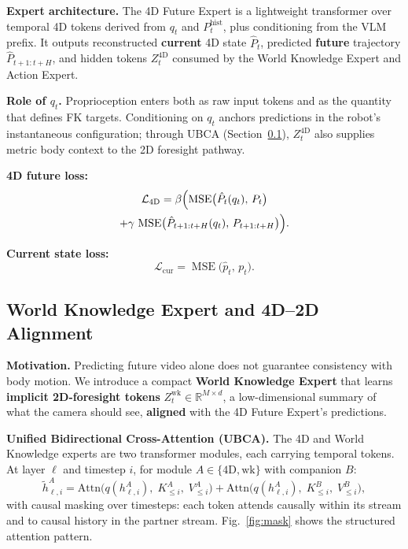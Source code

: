 \documentclass[journal]{IEEEtran}
\begin{document}
\textbf{Expert architecture.} The 4D Future Expert is a lightweight
transformer over temporal 4D tokens derived from $q_t$ and
$P^{\mathrm{hist}}_t$, plus conditioning from the VLM prefix. It outputs
reconstructed \textbf{current} 4D state $\hat{P}_t$, predicted
\textbf{future} trajectory $\hat{P}_{t+1:t+H}$, and hidden tokens
$Z^{\mathrm{4D}}_t$ consumed by the World Knowledge Expert and Action
Expert.

\textbf{Role of $q_t$.} Proprioception enters both as raw input tokens
and as the quantity that defines FK targets. Conditioning on $q_t$
anchors predictions in the robot's instantaneous configuration; through
UBCA (Section~\ref{sec:wk}), $Z^{\mathrm{4D}}_t$ also supplies metric
body context to the 2D foresight pathway.

\textbf{4D future loss:}
\begin{multline}
\mathcal{L}_{\mathrm{4D}} = \beta \Bigl(
    \operatorname{MSE}\bigl(\hat{P}_t(q_t),\, P_t\bigr) \\
    + \gamma\, \operatorname{MSE}\bigl(\hat{P}_{t+1:t+H}(q_t),\, P_{t+1:t+H}\bigr)
\Bigr).
\label{eq:loss4d}
\end{multline}

\textbf{Current state loss:}
\begin{equation}
\mathcal{L}_{\mathrm{cur}} = \operatorname{MSE}\bigl(\hat{p}_t,\, p_t\bigr).
\label{eq:losscur}
\end{equation}

\subsection{World Knowledge Expert and 4D--2D Alignment}
\label{sec:wk}

\textbf{Motivation.} Predicting future video alone does not guarantee
consistency with body motion. We introduce a compact \textbf{World
Knowledge Expert} that learns \textbf{implicit 2D-foresight tokens}
$Z^{\mathrm{wk}}_t \in \mathbb{R}^{M \times d}$, a low-dimensional
summary of what the camera should see, \textbf{aligned} with the 4D
Future Expert's predictions.

\textbf{Unified Bidirectional Cross-Attention (UBCA).} The 4D and World
Knowledge experts are two transformer modules, each carrying temporal
tokens. At layer $\ell$ and timestep $i$, for module
$A \in \{\mathrm{4D}, \mathrm{wk}\}$ with companion $B$:
\begin{equation}
\tilde{h}^A_{\ell,i} = \mathrm{Attn}\bigl(q(h^A_{\ell,i}),\; K^A_{\le i},\; V^A_{\le i}\bigr)
+ \mathrm{Attn}\bigl(q(h^A_{\ell,i}),\; K^B_{\le i},\; V^B_{\le i}\bigr),
\label{eq:ubca}
\end{equation}
with causal masking over timesteps: each token attends causally within
its stream and to causal history in the partner stream.
Fig.~\ref{fig:mask} shows the structured attention pattern.
\end{document}
